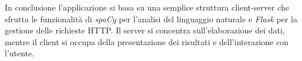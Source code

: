 \documentclass[12pt]{report}
\newcommand{\flask}{\textsl{Flask}\xspace}
\newcommand{\spacy}{\textsl{spaCy}\xspace}
\newcommand{\http}{\textsf{HTTP}\xspace}
\begin{document}


In conclusione l'applicazione si basa su una semplice struttura client-server che sfrutta le funzionalità di \spacy per l'analisi del linguaggio naturale e \flask per la gestione delle richieste \http. Il server si concentra sull'elaborazione dei dati, mentre il client si occupa della presentazione dei risultati e dell'interazione con l'utente.
\end{document}
